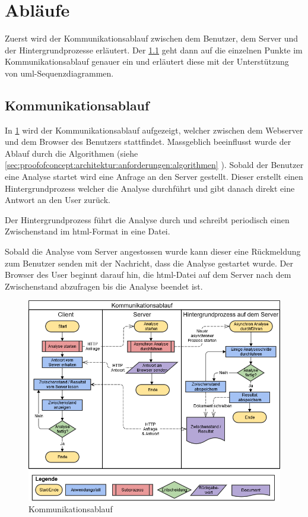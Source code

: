 \section{Abläufe}
Zuerst wird der Kommunikationsablauf zwischen dem Benutzer, dem Server und der Hintergrundprozesse erläutert. Der \cref{sec:proofofconcept:kommunikationsablauf} geht dann auf die einzelnen Punkte im Kommunikationsablauf genauer ein und erläutert diese mit der Unterstützung von \gls{uml}-Sequenzdiagrammen.

\subsection{Kommunikationsablauf}
\label{sec:proofofconcept:kommunikationsablauf}
In \cref{fig:proofofconcept:kommunikationsablauf:1} wird der Kommunikationsablauf aufgezeigt, welcher zwischen dem Webserver und dem Browser des Benutzers stattfindet. Massgeblich beeinflusst wurde der Ablauf durch die Algorithmen (siehe \cref{sec:proofofconcept:architektur:anforderungen:algorithmen} ). Sobald der Benutzer eine Analyse startet wird eine Anfrage an den Server gestellt. Dieser erstellt einen Hintergrundprozess welcher die Analyse durchführt und gibt danach direkt eine Antwort an den User zurück. 

Der Hintergrundprozess führt die Analyse durch und schreibt periodisch einen Zwischenstand im \gls{html}-Format in eine Datei.

Sobald die Analyse vom Server angestossen wurde kann dieser eine Rückmeldung zum Benutzer senden mit der Nachricht, dass die Analyse gestartet wurde. Der Browser des User beginnt darauf hin, die \gls{html}-Datei auf dem Server nach dem Zwischenstand abzufragen bis die Analyse beendet ist.
\begin{figure}[H]
	\RawFloats
	\centering
	\includegraphics[width=1\textwidth]{images/diagram-communication-flow}
	\caption{Kommunikationsablauf}
	\label{fig:proofofconcept:kommunikationsablauf:1}
\end{figure}



